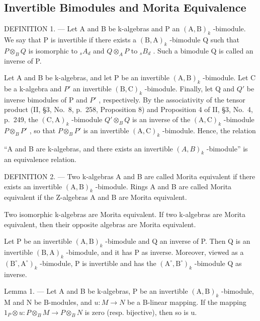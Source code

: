 \subsection{Invertible Bimodules and Morita Equivalence}

DEFINITION 1. --- Let A and B be k-algebras and P an \((\mathrm{A},\mathrm{B})_{k}\) -bimodule. We say that P is invertible if there exists a \((\mathrm{B},\mathrm{A})_{k}\) -bimodule Q such that \(P \otimes_{B} Q\) is isomorphic to \(_{s}A_{d}\) and \(Q \otimes_{A} P\) to \(_{s}B_{d}\) . Such a bimodule Q is called an inverse of P.

Let A and B be k-algebras, and let P be an invertible \((\mathrm{A},\mathrm{B})_{k}\) -bimodule. Let C be a k-algebra and \(P'\) an invertible \((\mathrm{B},\mathrm{C})_{k}\) -bimodule. Finally, let Q and \(Q'\) be inverse bimodules of P and \(P'\) , respectively. By the associativity of the tensor product (II, §3, No.~8, p.~258, Proposition 8) and Proposition 4 of II, §3, No.~4, p.~249, the \((\mathrm{C},\mathrm{A})_{k}\) -bimodule \(Q'\otimes_{B}Q\) is an inverse of the \((\mathrm{A},\mathrm{C})_{k}\) -bimodule \(P\otimes_{B}P'\) , so that \(P\otimes_{B}P'\) is an invertible \((\mathrm{A},\mathrm{C})_{k}\) -bimodule. Hence, the relation

``A and B are k-algebras, and there exists an invertible \((A,B)_{k}\) -bimodule'' is an equivalence relation.

DEFINITION 2. --- Two k-algebras A and B are called Morita equivalent if there exists an invertible \((\mathrm{A},\mathrm{B})_{k}\) -bimodule. Rings A and B are called Morita equivalent if the Z-algebras A and B are Morita equivalent.

Two isomorphic k-algebras are Morita equivalent. If two k-algebras are Morita equivalent, then their opposite algebras are Morita equivalent.

Let P be an invertible \((\mathrm{A},\mathrm{B})_{k}\) -bimodule and Q an inverse of P. Then Q is an invertible \((\mathrm{B},\mathrm{A})_{k}\) -bimodule, and it has P as inverse. Moreover, viewed as a \((\mathrm{B}^{\circ},\mathrm{A}^{\circ})_{k}\) -bimodule, P is invertible and has the \((\mathrm{A}^{\circ},\mathrm{B}^{\circ})_{k}\) -bimodule Q as inverse.

Lemma 1. --- Let A and B be k-algebras, P be an invertible \((\mathrm{A},\mathrm{B})_{k}\) -bimodule, M and N be B-modules, and \(u:M\to N\) be a B-linear mapping. If the mapping \(1_{P}\otimes u:P\otimes_{B}M\to P\otimes_{B}N\) is zero (resp. bijective), then so is u.

